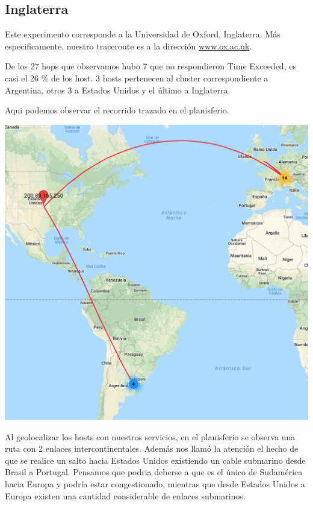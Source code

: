 \subsection{Inglaterra}

Este experimento corresponde a la Universidad de Oxford, Inglaterra. Más especificamente, nuestro traceroute es a la dirección \url{www.ox.ac.uk}.

De los 27 hops que observamos hubo 7 que no respondieron Time Exceeded, es casi el 26 \% de los host. 3 hosts pertenecen al cluster correspondiente a Argentina, otros 3 a Estados Unidos y el último a Inglaterra.

Aqui podemos observar el recorrido trazado en el planisferio.

\includegraphics[width=\textwidth]{oxford_mapa.jpg}

Al geolocalizar los hosts con nuestros servicios, en el planisferio se observa una ruta con 2 enlaces intercontinentales. Además nos llamó la atención el hecho de que se realice un salto hacia Estados Unidos existiendo un cable submarino desde Brasil a Portugal. Pensamos que podria deberse a que es el único de Sudamérica hacia Europa y podría estar congestionado, mientras que desde Estados Unidos a Europa existen una cantidad considerable de enlaces submarinos.

